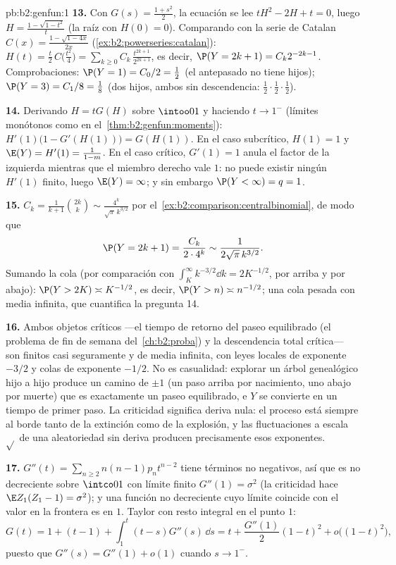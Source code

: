 \begin{solution}{pb:b2:genfun:1}
\textbf{13.} Con $G(s) = \frac{1 + s^2}2$, la ecuación se lee $tH^2 -
2H + t = 0$, luego $H = \frac{1 - \sqrt{1 - t^2}}{t}$ (la raíz con
$H(0) = 0$). Comparando con la serie de Catalan $C(x) = \frac{1 -
\sqrt{1 - 4x}}{2x}$ (\cref{ex:b2:powerseries:catalan}): $H(t) =
\frac t2\,C\bigl(\frac{t^2}4\bigr) =
\sum_{k\geq0}C_k\,\frac{t^{2k+1}}{2^{2k+1}}$, es decir, $\P(Y = 2k+1)
= C_k2^{-2k-1}$. Comprobaciones: $\P(Y = 1) = C_0/2 = \frac12$ (el
antepasado no tiene hijos); $\P(Y = 3) = C_1/8 = \frac18$ (dos hijos,
ambos sin descendencia: $\frac12\cdot\frac12\cdot \frac12$).

\textbf{14.} Derivando $H = tG(H)$ sobre $\intoo01$ y haciendo $t \to
1^-$ (límites monótonos como en el~\cref{thm:b2:genfun:moments}): $H'(1)\bigl(1 - G'(H(1))\bigr) =
G(H(1))$. En el caso subcrítico, $H(1) = 1$ y $\E(Y) = H'(1) =
\frac1{1 - m}$. En el caso crítico, $G'(1) = 1$ anula el factor de la
izquierda mientras que el miembro derecho vale $1$: no puede existir
ningún $H'(1)$ finito, luego $\E(Y) = \infty$; y sin embargo $\P(Y <
\infty) = q = 1$.

\textbf{15.} $C_k = \frac1{k+1}\binom{2k}k \sim
\frac{4^k}{\sqrt\pi\,k^{3/2}}$ por el~\cref{ex:b2:comparison:centralbinomial}, de modo que
\[
\P(Y = 2k+1) = \frac{C_k}{2\cdot4^{k}} \sim
\frac1{2\sqrt\pi\,k^{3/2}} .
\]
Sumando la cola (por comparación con $\int_K^\infty k^{-3/2}\dd k =
2K^{-1/2}$, por arriba y por abajo): $\P(Y > 2K) \asymp K^{-1/2}$, es
decir, $\P(Y > n) \asymp n^{-1/2}$; una cola pesada con media
infinita, que cuantifica la pregunta 14.

\textbf{16.} Ambos objetos críticos ---el tiempo de retorno del paseo
equilibrado (el problema de fin de semana del~\cref{ch:b2:proba}) y
la descendencia total crítica--- son finitos casi seguramente y de
media infinita, con leyes locales de exponente $-3/2$ y colas de
exponente $-1/2$. No es casualidad: explorar un árbol genealógico
hijo a hijo produce un camino de $\pm1$ (un paso arriba por
nacimiento, uno abajo por muerte) que es exactamente un paseo
equilibrado, e $Y$ se convierte en un tiempo de primer paso. La
criticidad significa deriva nula: el proceso está siempre al borde
tanto de la extinción como de la explosión, y las fluctuaciones a
escala $\sqrt{}$ de una aleatoriedad sin deriva producen precisamente
esos exponentes.

\textbf{17.} $G''(t) = \sum_{n\geq2}n(n-1)p_nt^{n-2}$ tiene términos
no negativos, así que es no decreciente sobre $\intco01$ con límite
finito $G''(1) = \sigma^2$ (la criticidad hace $\E Z_1(Z_1 - 1) =
\sigma^2$); y una función no decreciente cuyo límite coincide con el
valor en la frontera es  en $1$. Taylor con resto integral
en el punto $1$:
\[
G(t) = 1 + (t - 1) + \int_1^t(t - s)G''(s)\,\dd s
= t + \frac{G''(1)}2(1-t)^2 + o\bigl((1-t)^2\bigr),
\]
puesto que $G''(s) = G''(1) + o(1)$ cuando $s \to 1^-$.


\end{solution}
